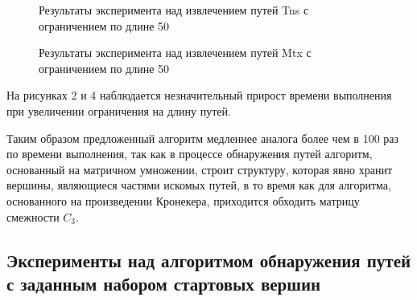 \begin{figure}[h!]
\begin{minipage}[h]{0.49\linewidth}
\caption{Результаты эксперимента над извлечением путей Tns с ограничением по длине 50}
\end{minipage}
\hfill
\begin{minipage}[h]{0.49\linewidth}
\caption{Результаты эксперимента над извлечением путей Mtx с ограничением по длине 50}
\end{minipage}
\end{figure}

На рисунках 2 и 4 наблюдается незначительный прирост времени выполнения при увеличении ограничения на длину путей.

Таким образом предложенный алгоритм медленнее аналога более чем в 100 раз по времени выполнения, так как в процессе обнаружения путей алгоритм, основанный на матричном умножении, строит структуру, которая явно хранит вершины, являющиеся частями искомых путей, в то время как для алгоритма, основанного на произведении Кронекера, приходится обходить матрицу смежности $C_3$.

\subsection{Эксперименты над алгоритмом обнаружения путей с заданным набором стартовых вершин}

